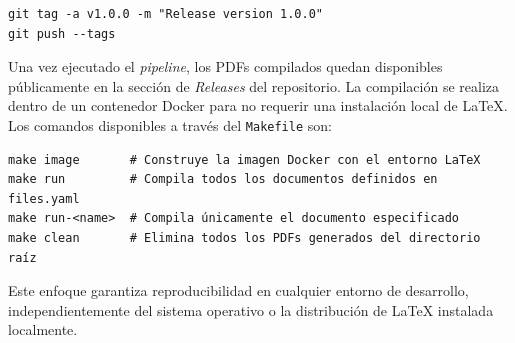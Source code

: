 \begin{verbatim}
git tag -a v1.0.0 -m "Release version 1.0.0"
git push --tags
\end{verbatim}

Una vez ejecutado el \textit{pipeline}, los PDFs compilados quedan disponibles públicamente en la sección de \textit{Releases} 
del repositorio. La compilación se realiza dentro de un contenedor Docker para no requerir una instalación local de \LaTeX{}. Los comandos 
disponibles a través del \texttt{Makefile} son:
\vspace{0.25cm}

\begin{verbatim}
make image       # Construye la imagen Docker con el entorno LaTeX
make run         # Compila todos los documentos definidos en files.yaml
make run-<name>  # Compila únicamente el documento especificado
make clean       # Elimina todos los PDFs generados del directorio raíz
\end{verbatim}

Este enfoque garantiza reproducibilidad en cualquier entorno de desarrollo, independientemente del sistema operativo o la 
distribución de \LaTeX{} instalada localmente.
\vspace{0.25cm}
